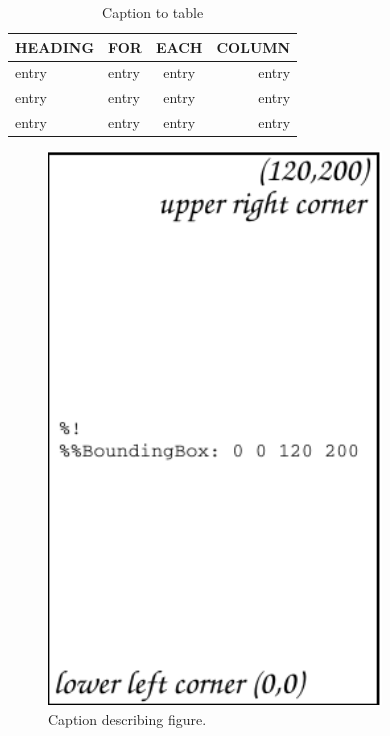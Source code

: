 \documentclass[preprint]{iucr}              %
\begin{document}




\begin{table}
\caption{Caption to table}
\begin{tabular}{llcr}      %
 HEADING    & FOR        & EACH       & COLUMN     \\
\hline
 entry      & entry      & entry      & entry      \\
 entry      & entry      & entry      & entry      \\
 entry      & entry      & entry      & entry      \\
\end{tabular}
\end{table}


\begin{figure}
\caption{Caption describing figure.}
\includegraphics[width = 8.85cm]{fig1}
\end{figure}
\end{document}
